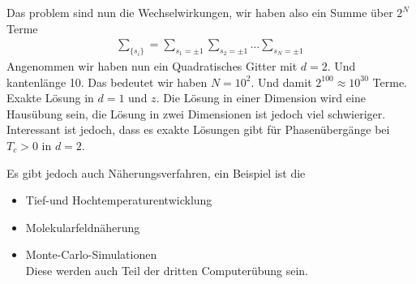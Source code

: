 \begin{description}
        Das problem sind nun die Wechselwirkungen, wir haben also ein Summe  
        über $2^N$ Terme
        \begin{align*}
          \sum_{\{s_i\}}^{} = \sum_{s_1 = \pm 1}^{} \sum_{s_2 = \pm 1}^{} \ldots\sum_{s_N = \pm 1}^{}
        \end{align*}
        Angenommen wir haben nun ein Quadratisches Gitter mit $d=2$.  Und
        kantenlänge 10. Das bedeutet  wir haben $N= 10^2$. Und damit
        $2^{100} \approx 10^{30}$ Terme. Exakte Lösung in 
        $d = 1$ und $z$. Die Lösung in einer Dimension wird eine Hausübung sein,
        die Lösung in zwei Dimensionen ist jedoch viel schwieriger. Interessant
        ist jedoch, dass es exakte Lösungen gibt für Phasenübergänge bei
        $T_c > 0$ in $d=2$.

        Es gibt jedoch auch Näherungsverfahren, ein Beispiel ist die 
        
        \begin{itemize}
          \item Tief-und Hochtemperaturentwicklung
          \item Molekularfeldnäherung
          \item Monte-Carlo-Simulationen \\
            Diese werden auch Teil der dritten Computerübung sein.
        \end{itemize}


        

        
      
    \end{description}
    








